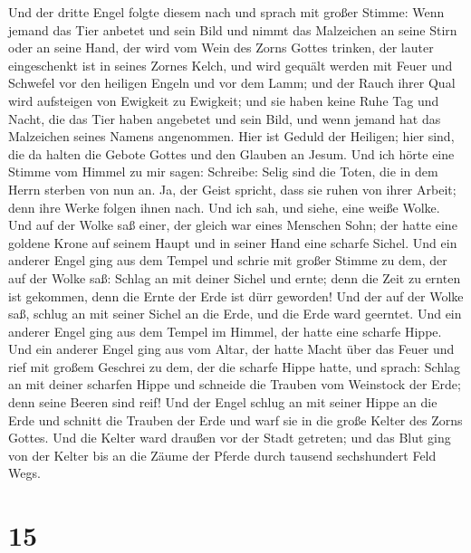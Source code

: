  Und der dritte Engel folgte diesem nach und sprach mit
großer Stimme: Wenn jemand das Tier anbetet und sein Bild und nimmt das
Malzeichen an seine Stirn oder an seine Hand,  der wird
vom Wein des Zorns Gottes trinken, der lauter eingeschenkt ist in seines
Zornes Kelch, und wird gequält werden mit Feuer und Schwefel vor den
heiligen Engeln und vor dem Lamm;  und der Rauch ihrer
Qual wird aufsteigen von Ewigkeit zu Ewigkeit; und sie haben keine Ruhe
Tag und Nacht, die das Tier haben angebetet und sein Bild, und wenn
jemand hat das Malzeichen seines Namens angenommen.  Hier
ist Geduld der Heiligen; hier sind, die da halten die Gebote Gottes und
den Glauben an Jesum.  Und ich hörte eine Stimme vom
Himmel zu mir sagen: Schreibe: Selig sind die Toten, die in dem Herrn
sterben von nun an. Ja, der Geist spricht, dass sie ruhen von ihrer
Arbeit; denn ihre Werke folgen ihnen nach.  Und ich sah,
und siehe, eine weiße Wolke. Und auf der Wolke saß einer, der gleich war
eines Menschen Sohn; der hatte eine goldene Krone auf seinem Haupt und
in seiner Hand eine scharfe Sichel.  Und ein anderer
Engel ging aus dem Tempel und schrie mit großer Stimme zu dem, der auf
der Wolke saß: Schlag an mit deiner Sichel und ernte; denn die Zeit zu
ernten ist gekommen, denn die Ernte der Erde ist dürr geworden!
 Und der auf der Wolke saß, schlug an mit seiner Sichel
an die Erde, und die Erde ward geerntet.  Und ein anderer
Engel ging aus dem Tempel im Himmel, der hatte eine scharfe Hippe.
 Und ein anderer Engel ging aus vom Altar, der hatte
Macht über das Feuer und rief mit großem Geschrei zu dem, der die
scharfe Hippe hatte, und sprach: Schlag an mit deiner scharfen Hippe und
schneide die Trauben vom Weinstock der Erde; denn seine Beeren sind
reif!  Und der Engel schlug an mit seiner Hippe an die
Erde und schnitt die Trauben der Erde und warf sie in die große Kelter
des Zorns Gottes.  Und die Kelter ward draußen vor der
Stadt getreten; und das Blut ging von der Kelter bis an die Zäume der
Pferde durch tausend sechshundert Feld Wegs.

\hypertarget{section-14}{%
\section{15}\label{section-14}}

